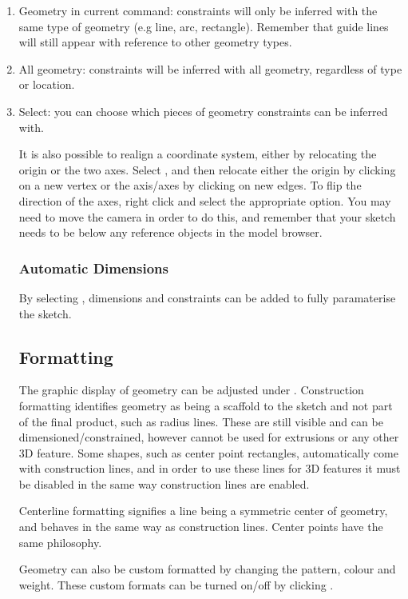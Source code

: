 \begin{enumerate}
    \item Geometry in current command: constraints will only be inferred with the same type of geometry (e.g line, arc, rectangle). Remember that guide lines will still appear with reference to other geometry types.
    \item All geometry: constraints will be inferred with all geometry, regardless of type or location.
    \item Select: you can choose which pieces of geometry constraints can be inferred with.

It is also possible to realign a coordinate system, either by relocating the origin or the two axes. Select , and then relocate either the origin by clicking on a new vertex or the axis/axes by clicking on new edges. To flip the direction of the axes, right click and select the appropriate option. You may need to move the camera in order to do this, and remember that your sketch needs to be below any reference objects in the model browser. 


\subsubsection{Automatic Dimensions}
By selecting , dimensions and constraints can be added to fully paramaterise the sketch.

\subsection{Formatting}

The graphic display of geometry can be adjusted under . Construction formatting identifies geometry as being a scaffold to the sketch and not part of the final product, such as radius lines. These are still visible and can be dimensioned/constrained, however cannot be used for extrusions or any other 3D feature. Some shapes, such as center point rectangles, automatically come with construction lines, and in order to use these lines for 3D features it must be disabled in the same way construction lines are enabled.

Centerline formatting signifies a line being a symmetric center of geometry, and behaves in the same way as construction lines. Center points have the same philosophy.

Geometry can also be custom formatted by changing the pattern, colour and weight. These custom formats can be turned on/off by clicking .


\end{enumerate}
